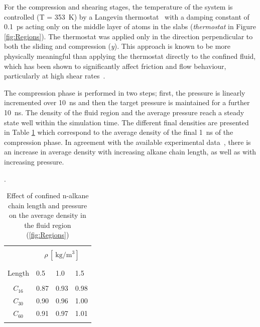 \documentclass[5p]{elsarticle}
\begin{document}
For the compression and shearing stages, the temperature of the system is controlled (T = \SI{353}{\kelvin}) by a Langevin thermostat~\cite{Schneider1978} with a damping constant of \SI{0.1}{\pico\second} acting only on the middle layer of atoms in the slabs (\textit{thermostat} in Figure \ref{fig:Regions}). The thermostat was applied only in the direction perpendicular to both the sliding and compression (\emph{y}). This approach is known to be more physically meaningful than applying the thermostat directly to the confined fluid, which has been shown to significantly affect friction and flow behaviour, particularly at high shear rates~\cite{Liem1992,Bernardi2010,Yong2013}.

The compression phase is performed in two steps; first, the pressure is linearly incremented over \SI{10}{\nano\second} and then the target pressure is maintained for a further \SI{10}{\nano\second}. The density of the fluid region and the average pressure reach a steady state well within the simulation time. The different final densities are presented in Table \ref{tab:rho} which correspond to the average density of the final \SI{1}{\nano\second} of the compression phase. In agreement with the available experimental data~\cite{Griesbaum2000}, there is an increase in average density with increasing alkane chain length, as well as with increasing pressure.

\begin{table}
	\caption{Effect of confined n-alkane chain length and pressure on the average density in the fluid region (\ref{fig:Regions})}.   
	\centering     
	\begin{tabular}{c | l l  l}
		\hline\hline\\ [-2ex]

		
										&	\multicolumn{3}{c}{ $\rho \, [\SI{}{\kilogram\per\cubic\meter}]$} \\

		\hline\\ [-2ex]
		\backslashbox{Chain \\ Length}{P $[\SI{}{\giga\pascal}]$}	&	0.5		&	1.0		&	1.5	\\

		\hline\\ [-2ex]
		$C_{16}$								&	0.87	&	0.93	&	0.98	\\
		$C_{30}$							&	0.90	&	0.96	&	1.00	\\	
		$C_{60}$								&	0.91	&	0.97	&	1.01	\\	

		\hline\hline    \\[-2ex]
	\end{tabular}
	\label{tab:rho}  
\end{table}
\end{document}
